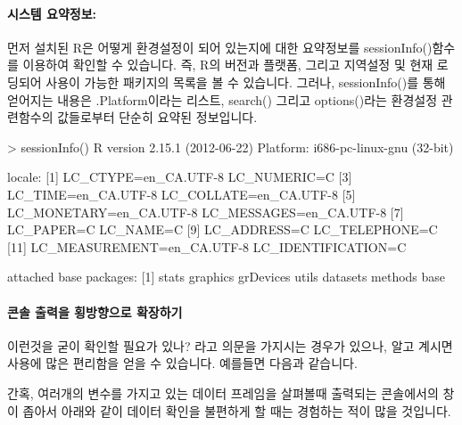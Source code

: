 \documentclass[tutorial.tex]{subfiles}
\begin{document}
\paragraph{시스템 요약정보:} 먼저 설치된 R은 어떻게 환경설정이 되어 있는지에 대한 요약정보를 sessionInfo()함수를 이용하여 확인할 수 있습니다.
즉, R의 버전과 플랫폼, 그리고 지역설정 및 현재 로딩되어 사용이 가능한 패키지의 목록을 볼 수 있습니다. 
그러나, sessionInfo()를 통해 얻어지는 내용은 .Platform이라는 리스트, search() 그리고 options()라는 환경설정 관련함수의 값들로부터 단순히 요약된 정보입니다. 

\begin{Schunk}
\begin{Soutput}
> sessionInfo()
R version 2.15.1 (2012-06-22)
Platform: i686-pc-linux-gnu (32-bit)

locale:
 [1] LC_CTYPE=en_CA.UTF-8       LC_NUMERIC=C              
 [3] LC_TIME=en_CA.UTF-8        LC_COLLATE=en_CA.UTF-8    
 [5] LC_MONETARY=en_CA.UTF-8    LC_MESSAGES=en_CA.UTF-8   
 [7] LC_PAPER=C                 LC_NAME=C                 
 [9] LC_ADDRESS=C               LC_TELEPHONE=C            
[11] LC_MEASUREMENT=en_CA.UTF-8 LC_IDENTIFICATION=C       

attached base packages:
[1] stats     graphics  grDevices utils     datasets  methods   base     
\end{Soutput}
\end{Schunk}

\paragraph{콘솔 출력을 횡방향으로 확장하기} 
이런것을 굳이 확인할 필요가 있나? 라고 의문을 가지시는 경우가 있으나, 알고 계시면 사용에 많은 편리함을 얻을 수 있습니다.
예를들면 다음과 같습니다.

간혹, 여러개의 변수를 가지고 있는 데이터 프레임을 살펴볼때 출력되는 콘솔에서의 창이 좁아서 아래와 같이 데이터 확인을 불편하게 할 때는 경험하는 적이 많을 것입니다. 

\begin{Schunk}
\end{Schunk}
\end{document}
